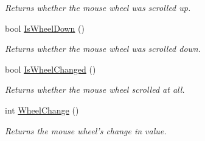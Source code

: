 \begin{DoxyCompactItemize}
\begin{DoxyCompactList}\small\item\em Returns whether the mouse wheel was scrolled up. \end{DoxyCompactList}\item 
bool \hyperlink{class_tri_devs_1_1_tri_engine_1_1_input_1_1_input_manager_aac031aa89929dbbaad20afc05ef0feba}{Is\-Wheel\-Down} ()
\begin{DoxyCompactList}\small\item\em Returns whether the mouse wheel was scrolled down. \end{DoxyCompactList}\item 
bool \hyperlink{class_tri_devs_1_1_tri_engine_1_1_input_1_1_input_manager_a595f7cfd6d2287f9cb2beff9e5a29221}{Is\-Wheel\-Changed} ()
\begin{DoxyCompactList}\small\item\em Returns whether the mouse wheel scrolled at all. \end{DoxyCompactList}\item 
int \hyperlink{class_tri_devs_1_1_tri_engine_1_1_input_1_1_input_manager_ac2729ed6240aaab956dc133e51216c5f}{Wheel\-Change} ()
\begin{DoxyCompactList}\small\item\em Returns the mouse wheel's change in value. \end{DoxyCompactList}\end{DoxyCompactItemize}
